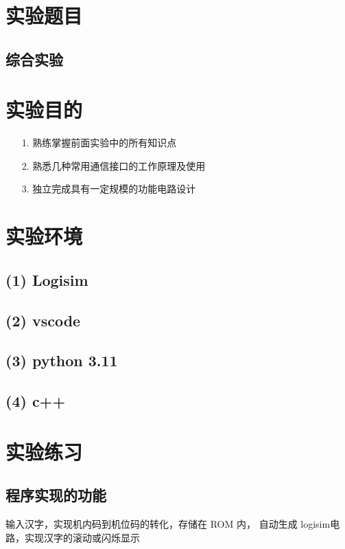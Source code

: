 \documentclass{article}
\begin{document}
    \section{实验题目}
        \subsection*{\qquad  综合实验}
     
    \section{实验目的}
        \begin{enumerate}
            \item [1.]熟练掌握前面实验中的所有知识点
            \item [2.]熟悉几种常用通信接口的工作原理及使用
            \item [3.]独立完成具有一定规模的功能电路设计
        \end{enumerate}

    \section{实验环境}
        \subsection*{\qquad (1) Logisim}
        \subsection*{\qquad (2) vscode}
        \subsection*{\qquad (3) python 3.11}
        \subsection*{\qquad (4) c++}
    
	\clearpage
    \section{实验练习}
	\subsection{程序实现的功能}
	输入汉字，实现机内码到机位码的转化，存储在 ROM 内，
	自动生成 logisim电路，实现汉字的滚动或闪烁显示
\end{document}
